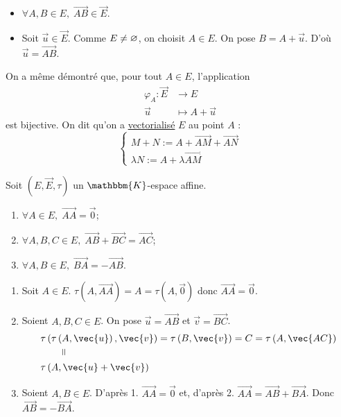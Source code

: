 \begin{prv}
	\begin{itemize}
		\item $\forall A, B \in E,\;\vec{AB} \in \vec{E}$.
		\item Soit $\vec{u} \in \vec{E}$. Comme $E \neq \varnothing$, on choisit $A \in E$. On pose $B = A + \vec{u}$. D'où $\vec{u} = \vec{AB}$.
	\end{itemize}
\end{prv}

\begin{rmk}
	On a même démontré que, pour tout $A \in E$, l'application \begin{align*}
		\varphi_A: \vec{E} &\longrightarrow E \\
		\vec{u} &\longmapsto A + \vec{u}
	\end{align*} est bijective. On dit qu'on a \underline{vectorialisé} $E$ au point $A$ : \[
		\begin{cases}
			M + N := A + \vec{AM} + \vec{AN}\\
			\lambda N := A + \lambda \vec{AM}
		\end{cases}
	\]
\end{rmk}

\begin{prop}
	Soit $\left( E, \vec{E}, \tau \right)$ un $\mathbbm{K}$-espace affine.
	\begin{enumerate}
		\item $\forall A \in E,\; \vec{AA} = \vec{0}$;
		\item $\forall A,B,C \in E,\;\vec{AB} + \vec{BC} = \vec{AC}$;
		\item $\forall A,B \in E,\; \vec{BA} = -\vec{AB}$.
	\end{enumerate}
\end{prop}

\begin{prv}
	\begin{enumerate}
		\item Soit $A \in E$. $\tau\left( A, \vec{AA} \right) = A = \tau\left( A, \vec{0} \right)$ donc $\vec{AA} = \vec{0}$.
		\item Soient $A, B, C \in E$. On pose $\vec{u} = \vec{AB}$ et $\vec{v} = \vec{BC}$.
			\begin{align*}
				&\tau\left( \tau\left( A, \vec{u} \right), \vec{v} \right) = \tau\left( B, \vec{v} \right) = C = \tau\left( A, \vec{AC} \right)\\
				&\kern 8mm\vrt=\\
				&\tau\left(A, \vec{u} + \vec{v}\right)\\
			\end{align*}
		\item Soient $A, B \in E$. D'après 1. $\vec{AA} = \vec{0}$ et, d'après 2. $\vec{AA} = \vec{AB} + \vec{BA}$. Donc $\vec{AB} = -\vec{BA}$.
	\end{enumerate}
\end{prv}
